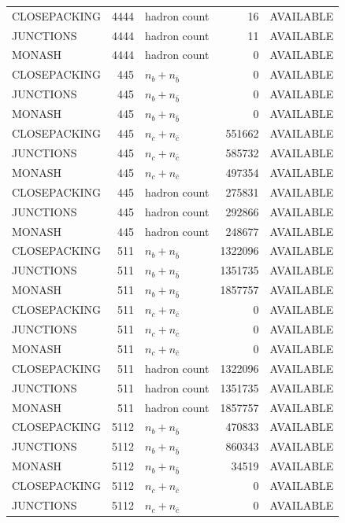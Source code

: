 \begin{landscape}
\begin{longtable}{@{}lrlrl@{}}
CLOSEPACKING & 4444 & hadron count & \num{16} & AVAILABLE \\
JUNCTIONS & 4444 & hadron count & \num{11} & AVAILABLE \\
MONASH & 4444 & hadron count & \num{0} & AVAILABLE \\
CLOSEPACKING & 445 & $n_b+n_{\bar b}$ & \num{0} & AVAILABLE \\
JUNCTIONS & 445 & $n_b+n_{\bar b}$ & \num{0} & AVAILABLE \\
MONASH & 445 & $n_b+n_{\bar b}$ & \num{0} & AVAILABLE \\
CLOSEPACKING & 445 & $n_c+n_{\bar c}$ & \num{551662} & AVAILABLE \\
JUNCTIONS & 445 & $n_c+n_{\bar c}$ & \num{585732} & AVAILABLE \\
MONASH & 445 & $n_c+n_{\bar c}$ & \num{497354} & AVAILABLE \\
CLOSEPACKING & 445 & hadron count & \num{275831} & AVAILABLE \\
JUNCTIONS & 445 & hadron count & \num{292866} & AVAILABLE \\
MONASH & 445 & hadron count & \num{248677} & AVAILABLE \\
CLOSEPACKING & 511 & $n_b+n_{\bar b}$ & \num{1322096} & AVAILABLE \\
JUNCTIONS & 511 & $n_b+n_{\bar b}$ & \num{1351735} & AVAILABLE \\
MONASH & 511 & $n_b+n_{\bar b}$ & \num{1857757} & AVAILABLE \\
CLOSEPACKING & 511 & $n_c+n_{\bar c}$ & \num{0} & AVAILABLE \\
JUNCTIONS & 511 & $n_c+n_{\bar c}$ & \num{0} & AVAILABLE \\
MONASH & 511 & $n_c+n_{\bar c}$ & \num{0} & AVAILABLE \\
CLOSEPACKING & 511 & hadron count & \num{1322096} & AVAILABLE \\
JUNCTIONS & 511 & hadron count & \num{1351735} & AVAILABLE \\
MONASH & 511 & hadron count & \num{1857757} & AVAILABLE \\
CLOSEPACKING & 5112 & $n_b+n_{\bar b}$ & \num{470833} & AVAILABLE \\
JUNCTIONS & 5112 & $n_b+n_{\bar b}$ & \num{860343} & AVAILABLE \\
MONASH & 5112 & $n_b+n_{\bar b}$ & \num{34519} & AVAILABLE \\
CLOSEPACKING & 5112 & $n_c+n_{\bar c}$ & \num{0} & AVAILABLE \\
JUNCTIONS & 5112 & $n_c+n_{\bar c}$ & \num{0} & AVAILABLE \\

\end{longtable}
\end{landscape}
